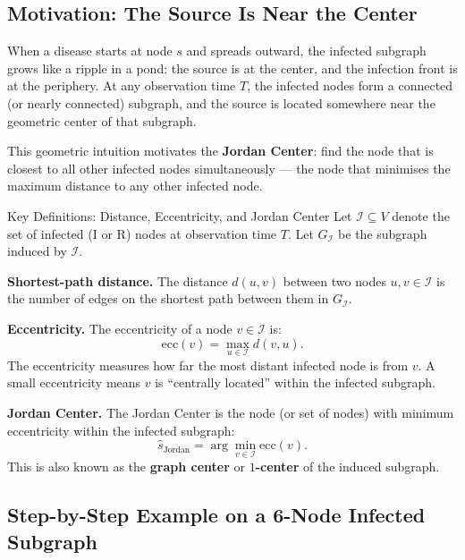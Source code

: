 \subsection{Motivation: The Source Is Near the Center}

When a disease starts at node $s$ and spreads outward, the infected subgraph grows
like a ripple in a pond: the source is at the center, and the infection front is at
the periphery. At any observation time $T$, the infected nodes form a connected (or
nearly connected) subgraph, and the source is located somewhere near the geometric
center of that subgraph.

This geometric intuition motivates the \textbf{Jordan Center}: find the node that is
closest to all other infected nodes simultaneously --- the node that minimises the
maximum distance to any other infected node.

\begin{conceptbox}{Key Definitions: Distance, Eccentricity, and Jordan Center}
Let $\mathcal{I} \subseteq V$ denote the set of infected (I or R) nodes at observation
time $T$. Let $G_{\mathcal{I}}$ be the subgraph induced by $\mathcal{I}$.

\medskip
\textbf{Shortest-path distance.} The distance $d(u, v)$ between two nodes $u, v \in
\mathcal{I}$ is the number of edges on the shortest path between them in
$G_{\mathcal{I}}$.

\medskip
\textbf{Eccentricity.} The eccentricity of a node $v \in \mathcal{I}$ is:
\begin{equation}
  \text{ecc}(v) = \max_{u \in \mathcal{I}} d(v, u).
  \label{eq:eccentricity}
\end{equation}
The eccentricity measures how far the most distant infected node is from $v$. A small
eccentricity means $v$ is ``centrally located'' within the infected subgraph.

\medskip
\textbf{Jordan Center.} The Jordan Center is the node (or set of nodes) with minimum
eccentricity within the infected subgraph:
\begin{equation}
  \hat{s}_{\text{Jordan}} = \arg\min_{v \in \mathcal{I}} \text{ecc}(v).
  \label{eq:jordan}
\end{equation}
This is also known as the \textbf{graph center} or \textbf{$1$-center} of the induced
subgraph.
\end{conceptbox}

\subsection{Step-by-Step Example on a 6-Node Infected Subgraph}

